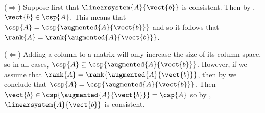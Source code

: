 ($\Rightarrow$) Suppose first that $\linearsystem{A}{\vect{b}}$ is consistent.  Then by , $\vect{b}\in\csp{A}$.  This means that $\csp{A}=\csp{\augmented{A}{\vect{b}}}$ and so it follows that $\rank{A}=\rank{\augmented{A}{\vect{b}}}$.\par
%
($\Leftarrow$)  Adding a column to a matrix will only increase the size of its column space, so in all cases, $\csp{A}\subseteq\csp{\augmented{A}{\vect{b}}}$.  However, if we assume that $\rank{A}=\rank{\augmented{A}{\vect{b}}}$, then by  we conclude that $\csp{A}=\csp{\augmented{A}{\vect{b}}}$.  Then $\vect{b}\in\csp{\augmented{A}{\vect{b}}}=\csp{A}$ so by , $\linearsystem{A}{\vect{b}}$ is consistent. 